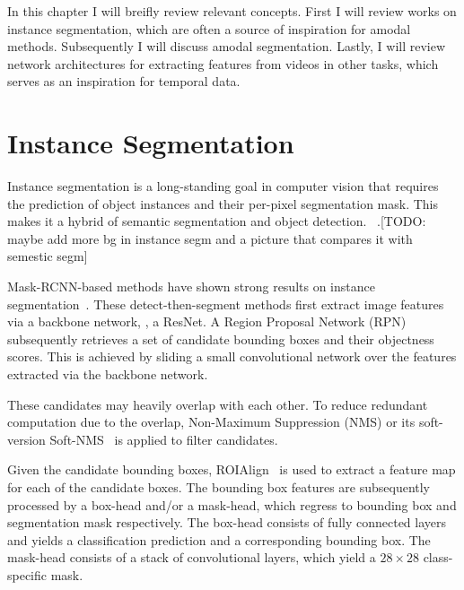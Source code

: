 In this chapter I will breifly review relevant concepts. First I will review works on instance segmentation, which are often a source of inspiration for amodal methods.
Subsequently I will discuss amodal segmentation. Lastly, I will review network architectures for extracting features from videos in other tasks, which serves as an inspiration for temporal data. 
\section{Instance Segmentation}

Instance segmentation is a long-standing goal in computer vision that requires the prediction of object instances and their per-pixel segmentation mask. This makes it a hybrid of semantic segmentation and object detection.
~\cite{BarinovaPAMI2012, RiemenschneiderECCV2012, KimCVPR2012, PinheiroNIPS2015, DaiCVPR2016, PinheiroECCV2016, DaiECCV2016, LiCVPR2017, liu2018path, fang2019instaboost, yolacticcv2019, lee2020centermask, Cao_D2Det_CVPR_2020, wang2020solo}.[TODO: maybe add more bg in instance segm and a picture that compares it with semestic segm] 

Mask-RCNN-based methods have shown strong results on instance segmentation~\cite{he2017mask, cai2018cascade, liu2018path, chen2019hybrid}. These detect-then-segment methods first extract image features via a backbone network, \eg, a ResNet. A Region Proposal Network (RPN)~\cite{ren2015faster} subsequently retrieves a set of candidate bounding boxes and their objectness scores. This is achieved by sliding a small convolutional network over the features extracted via the  backbone network. 

These candidates may  heavily overlap with each other. %
To reduce redundant computation due to the overlap, Non-Maximum Suppression (NMS) or its soft-version Soft-NMS~\cite{bodla2017soft} is applied to filter   candidates. 

Given the candidate bounding boxes,  ROIAlign~\cite{he2017mask} is used to extract a feature map for each of the candidate boxes. The bounding box features are subsequently processed by a box-head and/or a mask-head, which regress to bounding box and segmentation mask respectively. The box-head consists of fully connected layers and yields a classification prediction and a  corresponding bounding box.  %
The mask-head consists of a stack of convolutional layers, which yield a $28 \times 28$ class-specific mask. 

